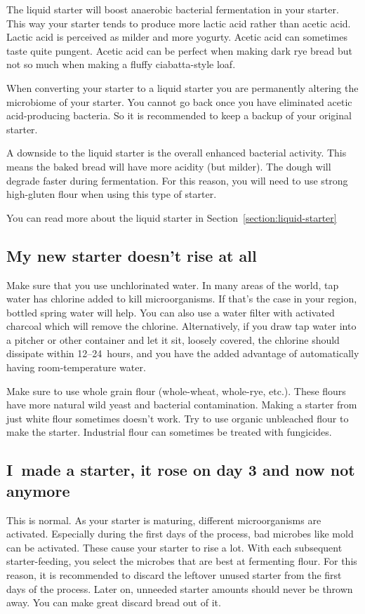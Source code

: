 The liquid starter will boost anaerobic bacterial
fermentation in your starter. This way your starter
tends to produce more lactic acid rather than acetic
acid. Lactic acid is perceived as milder and more
yogurty. Acetic acid can sometimes taste quite
pungent. Acetic acid can be perfect when making 
dark rye bread but not so much when making a fluffy
ciabatta-style loaf.

When converting your starter to a liquid starter you are
permanently altering the microbiome of your starter.
You cannot go back once you have eliminated acetic
acid-producing bacteria. So it is recommended to keep
a backup of your original starter.

A downside to the liquid starter is the overall
enhanced bacterial activity. This means the baked bread
will have more acidity (but milder). The dough will degrade
faster during fermentation. For this reason, you
will need to use strong high-gluten flour when using
this type of starter.

You can read more about the liquid starter in
Section~\ref{section:liquid-starter}

\subsection{My new starter doesn't rise at all}

Make sure that you use unchlorinated water.
In many areas of the world, tap water has
chlorine added to kill microorganisms. If that's
the case in your region, bottled spring water will
help.
You can also use a water filter with activated charcoal
which will remove the chlorine.
Alternatively, if you draw tap water into a pitcher or other
container and let it sit, loosely covered, the chlorine
should dissipate within 12--24~hours, and you have
the added advantage of automatically having
room-temperature water.

Make sure to use whole grain flour (whole-wheat, whole-rye, etc.).
These flours have more natural wild yeast and
bacterial contamination. Making a starter
from just white flour sometimes doesn't work.
Try to use organic unbleached flour to make
the starter. Industrial flour can sometimes
be treated with fungicides.

\subsection{I~made a starter, it rose on day 3 and now not anymore}

This is normal. As your starter is maturing, different
microorganisms are activated. Especially during
the first days of the process, bad microbes
like mold can be activated. These cause your
starter to rise a lot. With each subsequent
starter-feeding, you select the microbes that are best
at fermenting flour. For this reason, it is
recommended to discard the leftover unused starter
from the first days of the process. Later on, unneeded
starter amounts should never be thrown away. You can make
great discard bread out of it.

